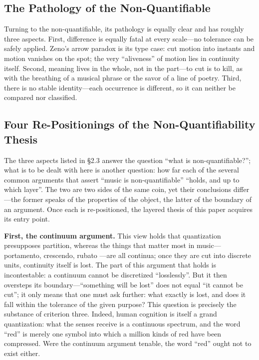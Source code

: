 \documentclass[11pt,a4paper]{article}
\begin{document}
\subsection{The Pathology of the Non-Quantifiable}

Turning to the non-quantifiable, its pathology is equally clear and has roughly three
aspects. First, difference is equally fatal at every scale---no tolerance can be safely
applied. Zeno's arrow paradox is its type case: cut motion into instants and motion
vanishes on the spot; the very ``aliveness'' of motion lies in continuity itself. Second,
meaning lives in the whole, not in the part---to cut is to kill, as with the breathing of
a musical phrase or the savor of a line of poetry. Third, there is no stable
identity---each occurrence is different, so it can neither be compared nor classified.

\subsection{Four Re-Positionings of the Non-Quantifiability Thesis}

The three aspects listed in \S2.3 answer the question ``what is non-quantifiable?''; what
is to be dealt with here is another question: how far each of the several common arguments
that assert ``music is non-quantifiable'' ``holds, and up to which layer''. The two are
two sides of the same coin, yet their conclusions differ---the former speaks of the
properties of the object, the latter of the boundary of an argument. Once each is
re-positioned, the layered thesis of this paper acquires its entry point.

\textbf{First, the continuum argument.} This view holds that quantization presupposes
partition, whereas the things that matter most in music---portamento, crescendo, rubato
---are all continua; once they are cut into discrete units, continuity itself is lost. The
part of this argument that holds is incontestable: a continuum cannot be discretized
``losslessly''. But it then oversteps its boundary---``something will be lost'' does not
equal ``it cannot be cut''; it only means that one must ask further: what exactly is lost,
and does it fall within the tolerance of the given purpose? This question is precisely the
substance of criterion three. Indeed, human cognition is itself a grand quantization: what
the senses receive is a continuous spectrum, and the word ``red'' is merely one symbol
into which a million kinds of red have been compressed. Were the continuum argument
tenable, the word ``red'' ought not to exist either.
\end{document}
